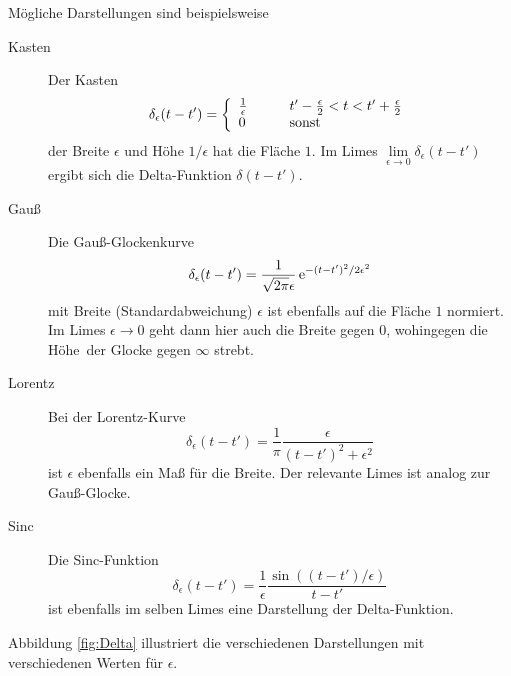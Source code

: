 \documentclass[paper=a4, fontsize=11.0pt, abstractoff, DIV12]{scrartcl}
\begin{document}
Mögliche Darstellungen sind beispielsweise
\begin{description}
    \item[Kasten] Der \glqq Kasten\grqq~
    \begin{equation}
    \delta_\epsilon(t-t') = \left\{\begin{array}{l l}\frac{1}{\epsilon} & \qquad t'-\frac{\epsilon}{2} < t < t'+\frac{\epsilon}{2}\\ 0 &\qquad\mathrm{sonst}\end{array}\right.
    \end{equation}
    der Breite $\epsilon$ und Höhe $1/\epsilon$ hat die Fläche $1$. Im Limes
    $\lim\limits_{\epsilon\to0}\delta_\epsilon(t-t')$ ergibt sich die
    Delta-Funktion $\delta(t-t')$.

    \item[Gauß] Die Gauß-Glockenkurve
    \begin{equation}
    \delta_\epsilon(t-t') = \frac{1}{\sqrt{2\pi}\epsilon} \,{\mathrm{e}}^{-(t-t')^2/2\epsilon^2}
    \end{equation}
    mit Breite (Standardabweichung) $\epsilon$ ist ebenfalls auf die Fläche
    $1$ normiert. Im Limes $\epsilon \to 0$ geht dann hier auch die Breite
    gegen $0$, wohingegen die \glqq Höhe\grqq~der Glocke gegen $\infty$
    strebt.
    \item[Lorentz] Bei der Lorentz-Kurve
    \begin{equation}
    \delta_\epsilon(t-t') = \frac{1}{\pi}\frac{\epsilon}{(t-t')^2 + \epsilon^2}
    \end{equation}
    ist $\epsilon$ ebenfalls ein Maß für die Breite. Der relevante Limes ist
    analog zur Gauß-Glocke.
    \item[Sinc] Die Sinc-Funktion
    \begin{equation}
    \delta_\epsilon(t-t') = \frac{1}{\epsilon} \frac{\sin((t-t')/\epsilon)}{t-t'}
    \end{equation}
    ist ebenfalls im selben Limes eine Darstellung der Delta-Funktion.
\end{description}
Abbildung \ref{fig:Delta} illustriert die verschiedenen Darstellungen mit
verschiedenen Werten für $\epsilon$.
\begin{figure*}[tb]
    \centering
    
    \caption{Von links nach rechts sind an verschiedenen Zeiten $t'$
    lokalisierte Kasten-, \mbox{Gauß-,} Lorentz- und Sinc-Darstellungen
    $\delta_\epsilon(t-t')$ der Delta-Funktion $\delta(t-t')$ geplottet.}
    \label{fig:Delta}
\end{figure*}
\end{document}
